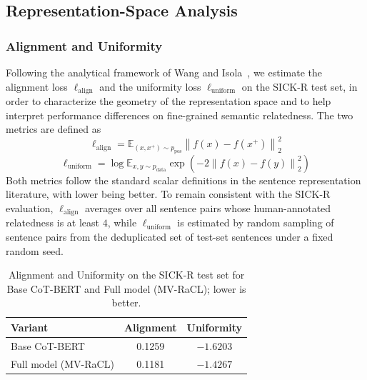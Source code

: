 \documentclass[a4paper,fleqn]{cas-dc}
\begin{document}
\subsection{Representation-Space Analysis}
\label{subsec:repr}

\subsubsection{Alignment and Uniformity}
\label{subsec:au}

Following the analytical framework of Wang and Isola~\cite{alignment}, we estimate the alignment loss $\ell_{\mathrm{align}}$ and the uniformity loss $\ell_{\mathrm{uniform}}$ on the SICK-R test set, in order to characterize the geometry of the representation space and to help interpret performance differences on fine-grained semantic relatedness. The two metrics are defined as
\begin{equation}
\ell_{\mathrm{align}}
=
\mathbb{E}_{(x,x^{+})\sim p_{\mathrm{pos}}}
\left\lVert f(x)-f(x^{+}) \right\rVert_2^{2}
\end{equation}
\begin{equation}
\ell_{\mathrm{uniform}}
=
\log \mathbb{E}_{x,y\sim p_{\mathrm{data}}}
\exp\!\left(-2\left\lVert f(x)-f(y) \right\rVert_2^{2}\right)
\end{equation}
Both metrics follow the standard scalar definitions in the sentence representation literature, with lower being better. To remain consistent with the SICK-R evaluation, $\ell_{\mathrm{align}}$ averages over all sentence pairs whose human-annotated relatedness is at least $4$, while $\ell_{\mathrm{uniform}}$ is estimated by random sampling of sentence pairs from the deduplicated set of test-set sentences under a fixed random seed.

\begin{table}[t]
\centering
\caption{Alignment and Uniformity on the SICK-R test set for Base CoT-BERT and Full model (MV-RaCL); lower is better.}
\label{tab:au}
\begin{tabular}{lcc}
\toprule
Variant & Alignment & Uniformity \\
\midrule
Base CoT-BERT        & 0.1259 & $-1.6203$ \\
Full model (MV-RaCL) & 0.1181 & $-1.4267$ \\
\bottomrule
\end{tabular}
\end{table}
\end{document}
